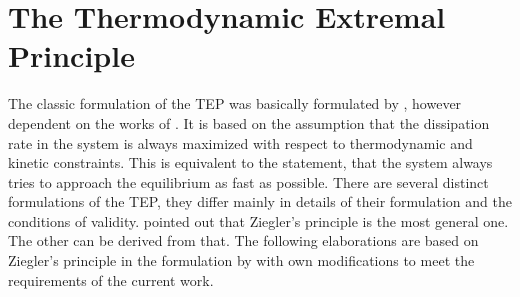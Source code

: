 \section{The Thermodynamic Extremal Principle}\label{sec:extremal-principle}

The classic formulation of the \gls{TEP} was basically formulated by \textcite{Svoboda1991}, however dependent on the works of \textcite{Ziegler1983, Ziegler1963, Onsager1931}.
It is based on the assumption that the dissipation rate in the system is always maximized with respect to thermodynamic and kinetic constraints.
This is equivalent to the statement, that the system always tries to approach the equilibrium as fast as possible.
There are several distinct formulations of the \gls{TEP}, they differ mainly in details of their formulation and the conditions of validity.
\textcite{Fischer2014} pointed out that Ziegler's principle is the most general one.
The other can be derived from that.
The following elaborations are based on Ziegler's principle in the formulation by \textcite{Svoboda1991} with own modifications to meet the requirements of the current work.

